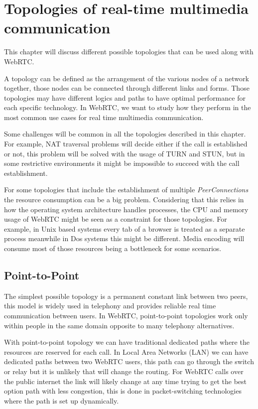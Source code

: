 \section{Topologies of real-time multimedia communication}
\label{sec:topologies}


\thispagestyle{empty}

This chapter will discuss different possible topologies that can be used along with WebRTC.

A topology can be defined as the arrangement of the various nodes of a network together, those nodes can be connected through different links and forms. Those topologies may have different logics and paths to have optimal performance for each specific technology. In WebRTC, we want to study how they perform in the most common use cases for real time multimedia communication.

Some challenges will be common in all the topologies described in this chapter. For example, NAT traversal problems will decide either if the call is established or not, this problem will be solved with the usage of TURN and STUN, but in some restrictive environments it might be impossible to succeed with the call establishment. 

For some topologies that include the establishment of multiple {\it PeerConnections} the resource consumption can be a big problem. Considering that this relies in how the operating system architecture handles processes, the CPU and memory usage of WebRTC might be seen as a constraint for those topologies. For example, in Unix based systems every tab of a browser is treated as a separate process meanwhile in Dos systems this might be different. Media encoding will consume most of those resources being a bottleneck for some scenarios.
 
\subsection{Point-to-Point}

The simplest possible topology is a permanent constant link between two peers, this model is widely used in telephony and provides reliable real time communication between users. In WebRTC, point-to-point topologies work only within people in the same domain opposite to many telephony alternatives.

With point-to-point topology we can have traditional dedicated paths where the resources are reserved for each call. In Local Area Networks (LAN)  we can have dedicated paths between two WebRTC users, this path can go through the switch or relay but it is unlikely that will change the routing. For WebRTC calls over the public internet the link will likely change at any time trying to get the best option path with less congestion, this is done in packet-switching technologies where the path is set up dynamically. 

